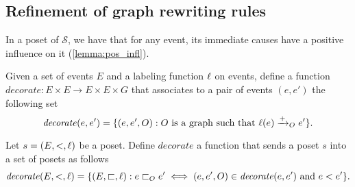 


\subsection{Refinement of graph rewriting rules}

In a poset of $\mathcal{S}$, we have that for any event, its immediate causes have a positive influence on it (\autoref{lemma:pos_infl}).

\begin{definition}
   Given a set of events $E$ and a labeling function $\ell$ on events, define a function $\mathit{decorate}:E\times E \to E\times E\times G$ that associates to a pair of events $(e,e')$ the following set
    \[
    \mathit{decorate}(e,e') = \{(e,e',O) : O\text{ is a graph such that }\ell(e)\mathrel{\xrightarrow{+}}_O e'\}.
    \]

    Let $s = (E,<,\ell)$ be a poset. Define $\mathit{decorate}$ a function that sends a poset $s$ into a set of posets as follows
    \[
    \mathit{decorate}(E,<,\ell) =\{(E,\sqsubset,\ell) : e\sqsubset_O e' \iff (e,e',O)\in\mathit{decorate}(e,e')\text{ and }
    e<e'\}.
    \]
\end{definition}

